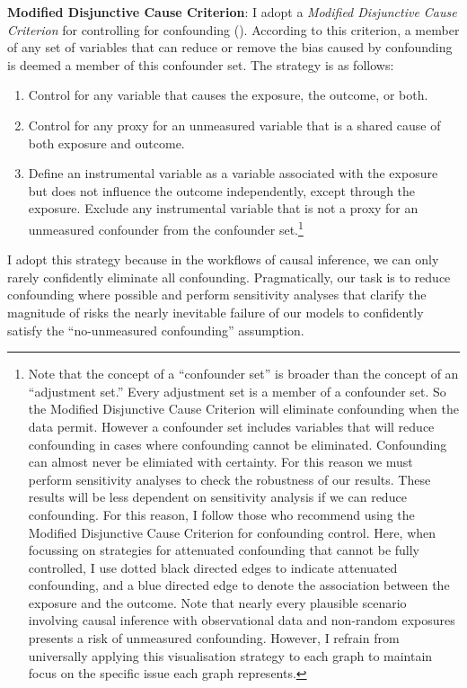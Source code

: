 \documentclass[
  singlecolumn,
  9pt]{article}
\providecommand{\tightlist}{%
  \setlength{\itemsep}{0pt}\setlength{\parskip}{0pt}}\usepackage{longtable,booktabs,array}
\begin{document}
\textbf{Modified Disjunctive Cause Criterion}: I adopt a \emph{Modified
Disjunctive Cause Criterion} for controlling for confounding
(). According to this
criterion, a member of any set of variables that can reduce or remove
the bias caused by confounding is deemed a member of this confounder
set. The strategy is as follows:

\begin{enumerate}
\def\labelenumi{\alph{enumi}.}
\tightlist
\item
  Control for any variable that causes the exposure, the outcome, or
  both.
\item
  Control for any proxy for an unmeasured variable that is a shared
  cause of both exposure and outcome.
\item
  Define an instrumental variable as a variable associated with the
  exposure but does not influence the outcome independently, except
  through the exposure. Exclude any instrumental variable that is not a
  proxy for an unmeasured confounder from the confounder set.\footnote{Note
    that the concept of a ``confounder set'' is broader than the concept
    of an ``adjustment set.'' Every adjustment set is a member of a
    confounder set. So the Modified Disjunctive Cause Criterion will
    eliminate confounding when the data permit. However a confounder set
    includes variables that will reduce confounding in cases where
    confounding cannot be eliminated. Confounding can almost never be
    elimiated with certainty. For this reason we must perform
    sensitivity analyses to check the robustness of our results. These
    results will be less dependent on sensitivity analysis if we can
    reduce confounding. For this reason, I follow those who recommend
    using the Modified Disjunctive Cause Criterion for confounding
    control. Here, when focussing on strategies for attenuated
    confounding that cannot be fully controlled, I use dotted black
    directed edges to indicate attenuated confounding, and a blue
    directed edge to denote the association between the exposure and the
    outcome. Note that nearly every plausible scenario involving causal
    inference with observational data and non-random exposures presents
    a risk of unmeasured confounding. However, I refrain from
    universally applying this visualisation strategy to each graph to
    maintain focus on the specific issue each graph represents.}
\end{enumerate}

I adopt this strategy because in the workflows of causal inference, we
can only rarely confidently eliminate all confounding. Pragmatically,
our task is to reduce confounding where possible and perform sensitivity
analyses that clarify the magnitude of risks the nearly inevitable
failure of our models to confidently satisfy the ``no-unmeasured
confounding'' assumption.
\end{document}
